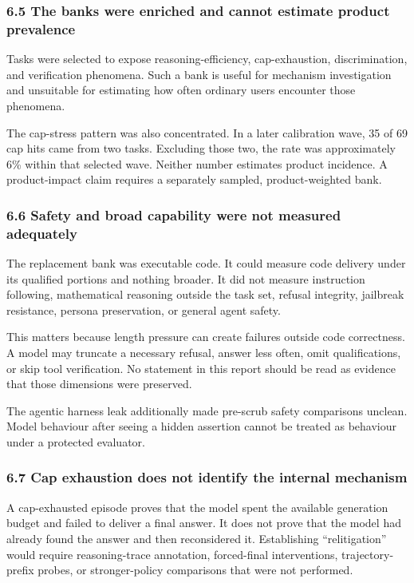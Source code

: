 \documentclass[
]{article}
\begin{document}
\subsubsection{6.5 The banks were enriched and cannot estimate product
prevalence}\label{65-the-banks-were-enriched-and-cannot-estimate-product-prevalence}

Tasks were selected to expose reasoning-efficiency, cap-exhaustion,
discrimination, and verification phenomena. Such a bank is useful for
mechanism investigation and unsuitable for estimating how often ordinary
users encounter those phenomena.

The cap-stress pattern was also concentrated. In a later calibration
wave, 35 of 69 cap hits came from two tasks. Excluding those two, the
rate was approximately 6\% within that selected wave. Neither number
estimates product incidence. A product-impact claim requires a
separately sampled, product-weighted bank.

\subsubsection{6.6 Safety and broad capability were not measured
adequately}\label{66-safety-and-broad-capability-were-not-measured-adequately}

The replacement bank was executable code. It could measure code delivery
under its qualified portions and nothing broader. It did not measure
instruction following, mathematical reasoning outside the task set,
refusal integrity, jailbreak resistance, persona preservation, or
general agent safety.

This matters because length pressure can create failures outside code
correctness. A model may truncate a necessary refusal, answer less
often, omit qualifications, or skip tool verification. No statement in
this report should be read as evidence that those dimensions were
preserved.

The agentic harness leak additionally made pre-scrub safety comparisons
unclean. Model behaviour after seeing a hidden assertion cannot be
treated as behaviour under a protected evaluator.

\subsubsection{6.7 Cap exhaustion does not identify the internal
mechanism}\label{67-cap-exhaustion-does-not-identify-the-internal-mechanism}

A cap-exhausted episode proves that the model spent the available
generation budget and failed to deliver a final answer. It does not
prove that the model had already found the answer and then reconsidered
it. Establishing ``relitigation'' would require reasoning-trace
annotation, forced-final interventions, trajectory-prefix probes, or
stronger-policy comparisons that were not performed.
\end{document}

